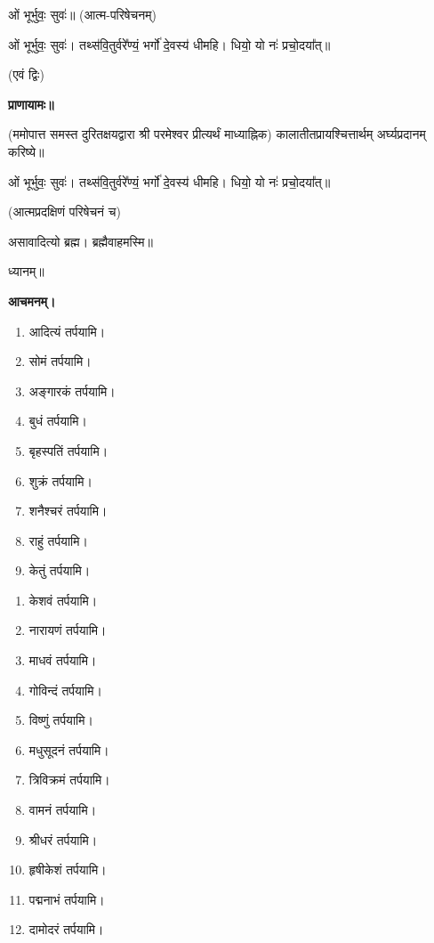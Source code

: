 ओं भूर्भुवः॒ सुवः॑॥ (आत्म-परिषेचनम्)



ओं भूर्भुवः॒ सुवः॑। तथ्स॑वि॒तुर्वरे᳚ण्यं॒ भर्गो॑ दे॒वस्य॑ धीमहि। धियो॒ यो नः॑ प्रचो॒दया᳚त्॥

\hfill{(एवं द्विः)}


\textbf{प्राणायामः॥}

(ममोपात्त समस्त दुरितक्षयद्वारा श्री परमेश्वर प्रीत्यर्थं माध्याह्निक)
कालातीतप्रायश्चित्तार्थम् अर्घ्यप्रदानम् करिष्ये॥

ओं भूर्भुवः॒ सुवः॑। तथ्स॑वि॒तुर्वरे᳚ण्यं॒ भर्गो॑ दे॒वस्य॑ धीमहि। धियो॒ यो नः॑ प्रचो॒दया᳚त्॥

(आत्मप्रदक्षिणं परिषेचनं च)


असावादित्यो ब्रह्म। ब्रह्मैवाहमस्मि॥

ध्यानम्॥

\textbf{आचमनम्।}



\begin{enumerate}
 \item आदित्यं तर्पयामि।
 \item सोमं तर्पयामि।
 \item अङ्गारकं तर्पयामि।
 \item बुधं तर्पयामि।
 \item बृहस्पतिं तर्पयामि।
 \item शुक्रं तर्पयामि।
 \item शनैश्चरं तर्पयामि।
 \item राहुं तर्पयामि।
 \item केतुं तर्पयामि।
\end{enumerate}


\begin{enumerate}
\item केशवं तर्पयामि।
\item नारायणं तर्पयामि।
\item माधवं तर्पयामि।
\item गोविन्दं तर्पयामि।
\item विष्णुं तर्पयामि।
\item मधुसूदनं तर्पयामि।
\item त्रिविक्रमं तर्पयामि।
\item वामनं तर्पयामि।
\item श्रीधरं तर्पयामि।
\item हृषीकेशं तर्पयामि।
\item पद्मनाभं तर्पयामि।
\item दामोदरं तर्पयामि।
\end{enumerate}

